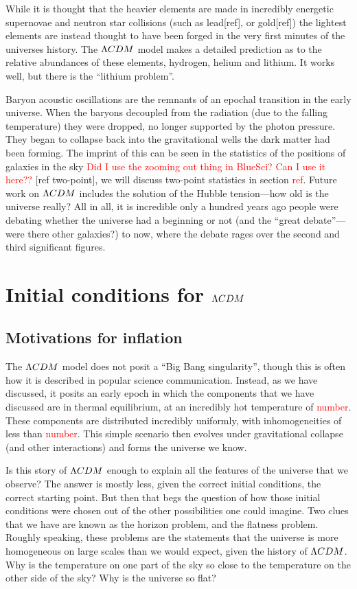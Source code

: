     While it is thought that the heavier elements are made in incredibly energetic supernovae and
    neutron star collisions (such as lead[ref], or gold[ref]) the lightest elements are instead thought to have been forged in the
    very first minutes of the universes history. The $\Lambda CDM$ model makes a detailed prediction as to the
    relative abundances of these elements, hydrogen, helium and lithium. It works well, but there is
    the ``lithium problem''.


    Baryon acoustic oscillations are the remnants of an epochal transition in the early universe.
    When the baryons decoupled from the radiation (due to the falling temperature) they were dropped,
    no longer supported by the photon pressure. They began to collapse back into the gravitational
    wells the dark matter had been forming. The imprint of this can be seen in the statistics
    of the positions of galaxies in the sky \textcolor{red}{Did I use the zooming out thing in
    BlueSci? Can I use it here??} [ref two-point], we will discuss two-point statistics in
    section \textcolor{red}{ref}.
\newpage
    Future work on $\Lambda CDM$ includes the solution of the Hubble tension---how old is the universe really?
    All in all, it is incredible only a hundred years ago people were debating whether the universe had a beginning or not
    (and the ``great debate''---were there other galaxies?) to now, where the debate rages over the second and third significant
    figures.
\newpage
\section{Initial conditions for $\Lambda CDM$}
    \subsection{Motivations for inflation}
    The $\Lambda CDM$ model does not posit a ``Big Bang singularity'', though this is often
    how it is described in popular science communication. Instead, as we have discussed, it
    posits an early epoch in which the components that we have discussed are in thermal equilibrium,
    at an incredibly hot temperature of \textcolor{red}{number}. These components are distributed incredibly uniformly,
    with inhomogeneities of less than \textcolor{red}{number}. This simple scenario then evolves
    under gravitational collapse (and other interactions) and forms the universe we know.


    Is this story of $\Lambda CDM$ enough to explain all the features of the
    universe that we observe? The answer is mostly less, given the correct initial conditions,
    the correct starting point. But then that begs the question of how those initial conditions
    were chosen out of the other possibilities one could imagine.
    Two clues that we have are known as the horizon problem, and the flatness problem.
    Roughly speaking, these problems are the statements that the universe is more homogeneous on
    large scales than we would expect, given the history of $\Lambda CDM$. Why is the temperature on one
    part of the sky so close to the temperature on the other side of the sky? Why is the universe
    so flat?


